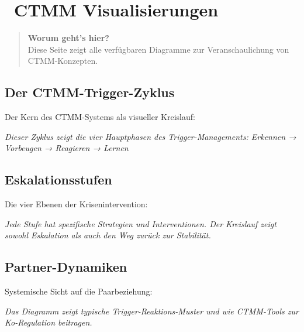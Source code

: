 
\section*{\textcolor{ctmmPurple}{\faChartArea~CTMM Visualisierungen}}

\begin{quote}
\textbf{\textcolor{ctmmPurple}{Worum geht's hier?}}\\
Diese Seite zeigt alle verfügbaren Diagramme zur Veranschaulichung von CTMM-Konzepten.
\end{quote}

\subsection*{\textcolor{ctmmBlue}{Der CTMM-Trigger-Zyklus}}

Der Kern des CTMM-Systems als visueller Kreislauf:

\ctmmTriggerLoop

\textit{Dieser Zyklus zeigt die vier Hauptphasen des Trigger-Managements: Erkennen → Vorbeugen → Reagieren → Lernen}

\subsection*{\textcolor{ctmmOrange}{Eskalationsstufen}}

Die vier Ebenen der Krisenintervention:

\ctmmEskalationsStufen

\textit{Jede Stufe hat spezifische Strategien und Interventionen. Der Kreislauf zeigt sowohl Eskalation als auch den Weg zurück zur Stabilität.}

\newpage

\subsection*{\textcolor{ctmmRed}{Partner-Dynamiken}}

Systemische Sicht auf die Paarbeziehung:

\ctmmPartnerDynamics

\textit{Das Diagramm zeigt typische Trigger-Reaktions-Muster und wie CTMM-Tools zur Ko-Regulation beitragen.}


